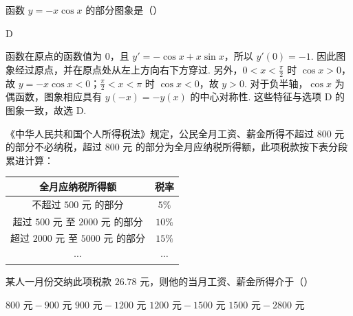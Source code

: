 \begin{problem}
函数 \( y = -x\cos x \) 的部分图象是（\quad）

    {}
    {}
    {}
\end{problem}

\begin{answer}
D
\end{answer}

\begin{solution}
函数在原点的函数值为 \(0\)，且 \(y'=-\cos x+x\sin x\)，所以 \(y'(0)=-1\).
因此图象经过原点，并在原点处从左上方向右下方穿过. 另外，\(0<x<\frac{\pi}{2}\) 时 \(\cos x>0\)，故 \(y=-x\cos x<0\)；\(\frac{\pi}{2}<x<\pi\) 时 \(\cos x<0\)，故 \(y>0\). 对于负半轴，\(\cos x\) 为偶函数，图象相应具有 \(y(-x)=-y(x)\) 的中心对称性. 这些特征与选项 D 的图象一致，故选 D.
\end{solution}

\begin{problem}
《中华人民共和国个人所得税法》规定，公民全月工资、薪金所得不超过 \(800\text{ 元}\) 的部分不必纳税，超过 \(800\text{ 元}\) 的部分为全月应纳税所得额，此项税款按下表分段累进计算：

\begin{center}
\begin{tabular}{|c|c|}
\hline
全月应纳税所得额 & 税率 \\
\hline
不超过 \(500\text{ 元}\) 的部分 & \(5\%\) \\
\hline
超过 \(500\text{ 元}\) 至 \(2000\text{ 元}\) 的部分 & \(10\%\) \\
\hline
超过 \(2000\text{ 元}\) 至 \(5000\text{ 元}\) 的部分 & \(15\%\) \\
\hline
\(\cdots\) & \(\cdots\) \\
\hline
\end{tabular}
\end{center}

某人一月份交纳此项税款 \(26.78\text{ 元}\)，则他的当月工资、薪金所得介于（\quad）

\choices
    {\(800\text{ 元} - 900\text{ 元}\)}
    {\(900\text{ 元} - 1200\text{ 元}\)}
    {\(1200\text{ 元} - 1500\text{ 元}\)}
    {\(1500\text{ 元} - 2800\text{ 元}\)}
\end{problem}

